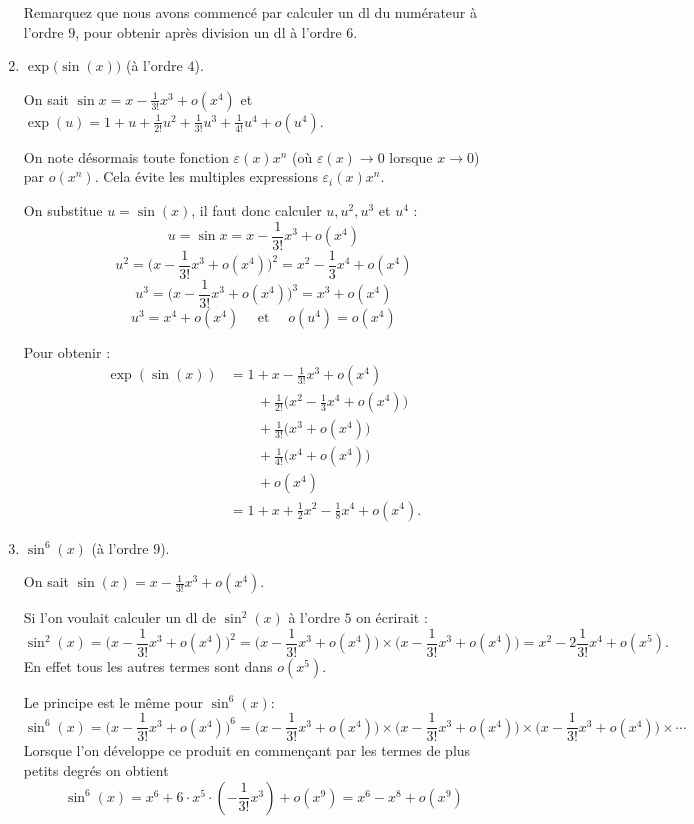 \documentclass[11pt,a4paper]{article}
\renewcommand{\epsilon}{\varepsilon}
\begin{document}
\begin{enumerate}
Remarquez que nous avons commencé par calculer un dl du numérateur à l'ordre $9$,
pour obtenir après division un dl à l'ordre $6$.


  \item $\exp\big(\sin(x)\big)$ (à l'ordre $4$).

On sait $\sin x= x -\frac{1}{3!}x^3 + o(x^4)$
et $\exp(u)=1+u+\frac1{2!} u^2+\frac{1}{3!}u^3+\frac{1}{4!}u^4+o(u^4)$.


On note désormais toute fonction $\epsilon(x)x^n$ (où $\epsilon(x)\to 0$ lorsque $x\to0$) par $o(x^n)$.
Cela évite les multiples expressions $\epsilon_i(x)x^n$.


On substitue $u=\sin(x)$, il faut donc calculer $u, u^2, u^3$ et $u^4$ : 
$$u = \sin x= x -\frac{1}{3!}x^3 + o(x^4)$$
$$u^2 = \big( x -\frac{1}{3!}x^3 + o(x^4)\big)^2 = x^2-\frac13 x^4 + o(x^4)$$
$$u^3 = \big( x -\frac{1}{3!}x^3 + o(x^4)\big)^3 = x^3 + o(x^4)$$
$$u^3 = x^4 + o(x^4) \quad \text{ et } \quad o(u^4)=o(x^4)$$

Pour obtenir :
\begin{align*}
  \exp(\sin(x)) 
    & =  1+ x -\frac{1}{3!}x^3 + o(x^4)\\
    &  \qquad   + \frac1{2!}\big(x^2-\frac13 x^4 + o(x^4)\big) \\
    &  \qquad   + \frac1{3!}\big(x^3 + o(x^4)\big) \\
    &  \qquad   + \frac1{4!}\big(x^4 + o(x^4)\big) \\    
    & \qquad + o(x^4) \\
    & = 1+x + \frac12 x^2 - \frac18 x^4 + o(x^4).
\end{align*}



  \item  $\sin^6(x)$ (à l'ordre $9$).

On sait $\sin (x)= x -\frac{1}{3!}x^3 + o(x^4)$.



Si l'on voulait calculer un dl de $\sin^2(x)$ à l'ordre $5$ on écrirait :
$$\sin^2 (x)  =  \big(x -\frac{1}{3!}x^3 + o(x^4)\big)^2 =  
\big(x -\frac{1}{3!}x^3 + o(x^4)\big) \times  \big(x -\frac{1}{3!}x^3 + o(x^4)\big) 
= x^2 -2\frac{1}{3!}x^4 + o(x^5).$$
En effet tous les autres termes sont dans $o(x^5)$.


Le principe est le même pour $\sin^6(x)$:
$$\sin^6 (x)  =  \big(x -\frac{1}{3!}x^3 + o(x^4)\big)^6 =  
\big(x -\frac{1}{3!}x^3 + o(x^4) \big) \times  \big(x -\frac{1}{3!}x^3 + o(x^4) \big) 
\times  \big(x -\frac{1}{3!}x^3 + o(x^4) \big) \times \cdots$$
Lorsque l'on développe ce produit en commençant par les termes de plus petits degrés on obtient 
$$\sin^6 (x)  =  x^6 + 6 \cdot x^5 \cdot (-\frac1{3!} x^3) + o(x^9) = x^6-x^8 + o(x^9)$$




\end{enumerate}
\end{document}
